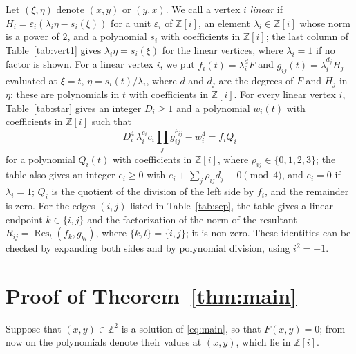 \documentclass[11pt]{article}
\newcommand{\Z}{\mathbb{Z}}
\begin{document}
Let $(\xi,\eta)$ denote $(x,y)$ or $(y,x)$. We call a vertex $i$ \emph{linear} if $H_i=\varepsilon_i(\lambda_i\eta-s_i(\xi))$ for a unit $\varepsilon_i$ of $\Z[i]$, an element $\lambda_i\in\Z[i]$ whose norm is a power of $2$, and a polynomial $s_i$ with coefficients in $\Z[i]$; the last column of Table~\ref{tab:vert1} gives $\lambda_i\eta=s_i(\xi)$ for the linear vertices, where $\lambda_i=1$ if no factor is shown. For a linear vertex $i$, we put $f_i(t)=\lambda_i^{d}F$ and $g_{ij}(t)=\lambda_i^{d_j}H_j$ evaluated at $\xi=t$, $\eta=s_i(t)/\lambda_i$, where $d$ and $d_j$ are the degrees of $F$ and $H_j$ in $\eta$; these are polynomials in $t$ with coefficients in $\Z[i]$.
For every linear vertex $i$, Table~\ref{tab:star} gives an integer $D_i\geq1$ and a polynomial $w_i(t)$ with coefficients in $\Z[i]$ such that
\begin{equation}\label{eq:starlin}
D_i^4\,\lambda_i^{e_i}c_i\prod_jg_{ij}^{\rho_{ij}}-w_i^4=f_iQ_i
\end{equation}
for a polynomial $Q_i(t)$ with coefficients in $\Z[i]$, where $\rho_{ij}\in\{0,1,2,3\}$; the table also gives an integer $e_i\geq0$ with $e_i+\sum_j\rho_{ij}d_j\equiv0\pmod4$, and $e_i=0$ if $\lambda_i=1$; $Q_i$ is the quotient of the division of the left side by $f_i$, and the remainder is zero.
For the edges $(i,j)$ listed in Table~\ref{tab:sep}, the table gives a linear endpoint $k\in\{i,j\}$ and the factorization of the norm of the resultant $R_{ij}=\operatorname{Res}_t(f_k,g_{kl})$, where $\{k,l\}=\{i,j\}$; it is non-zero.
These identities can be checked by expanding both sides and by polynomial division, using $i^2=-1$.

\section{Proof of Theorem~\ref{thm:main}}

Suppose that $(x,y)\in\Z^2$ is a solution of \eqref{eq:main}, so that $F(x,y)=0$; from now on the polynomials denote their values at $(x,y)$, which lie in $\Z[i]$.
\end{document}
